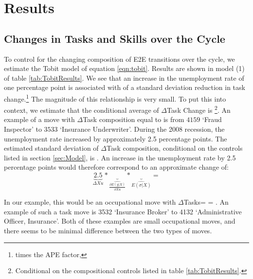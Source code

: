 \documentclass[11pt, oneside]{article}
\begin{document}
\section{Results}
\label{sec:results}


\subsection{Changes in Tasks and  Skills over the Cycle}
\label{sec:TobitProbit}


To control for the changing composition of E2E transitions over the cycle, we estimate the Tobit model of equation \ref{eqn:tobit}. Results are shown in model (1) of table \ref{tab:TobitResults}. We see that an increase in the unemployment rate of one percentage point is associated with \hspace{-1mm} of a standard deviation reduction in task change.\footnote{\hspace{-1mm} times the APE factor, \hspace{-1mm}} The magnitude of this relationship is very small. To put this into context, we estimate that the conditional average of $\Delta$Task Change is \hspace{-1mm}\footnote{Conditional on the compositional controls listed in table \ref{tab:TobitResults}.}. An example of a move with $\Delta$Task composition equal to \hspace{-1mm}  is from $4159$ `Fraud Inspector' to $3533$ `Insurance Underwriter'. During the 2008 recession, the unemployment rate increased by approximately 2.5 percentage points. The estimated standard deviation of $\Delta$Task composition, conditional on the controls listed in section \ref{sec:Model}, is \hspace{-1mm}. An increase in the unemployment rate by 2.5 percentage points would therefore correspond to an approximate change of:
\[
\underbrace{2.5}_{\Delta Xu}* \underbrace{}_{\widehat{\frac{\partial E(y| X)}{\partial Xu}}} *\underbrace{}_{ \widehat{E(\sigma|X)}} = 
\]

\noindent In our example, this would be an occupational move with $\Delta$Tasks=\hspace{-1mm}  =  \hspace{-1.5mm}. An example of such a task move is 3532 `Insurance Broker' to 4132 `Administrative Officer, Insurance'. Both of these examples are small occupational moves, and there seems to be minimal difference between the two types of moves.
\end{document}

